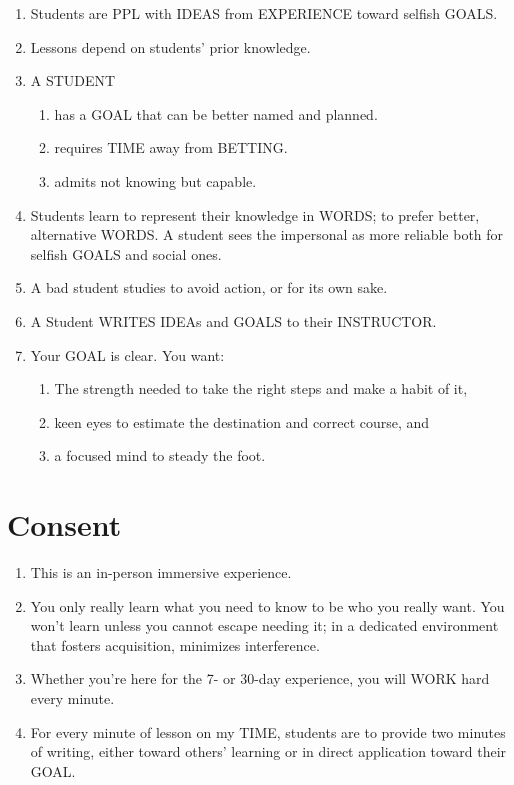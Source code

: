 \documentclass[
]{book}
\providecommand{\tightlist}{%
  \setlength{\itemsep}{0pt}\setlength{\parskip}{0pt}}
\begin{document}
\begin{enumerate}
\def\labelenumi{\arabic{enumi}.}
\setcounter{enumi}{26}
\tightlist
\item
  Students are PPL with IDEAS from EXPERIENCE toward selfish GOALS.
\item
  Lessons depend on students' prior knowledge.
\item
  A STUDENT

  \begin{enumerate}
  \def\labelenumii{\arabic{enumii}.}
  \tightlist
  \item
    has a GOAL that can be better named and planned.
  \item
    requires TIME away from BETTING.
  \item
    admits not knowing but capable.
  \end{enumerate}
\item
  Students learn to represent their knowledge in WORDS; to prefer
  better, alternative WORDS. A student sees the impersonal as more
  reliable both for selfish GOALS and social ones.
\item
  A bad student studies to avoid action, or for its own sake.
\item
  A Student WRITES IDEAs and GOALS to their INSTRUCTOR.
\item
  Your GOAL is clear. You want:

  \begin{enumerate}
  \def\labelenumii{\arabic{enumii}.}
  \tightlist
  \item
    The strength needed to take the right steps and make a habit of
    it,
  \item
    keen eyes to estimate the destination and correct course, and
  \item
    a focused mind to steady the foot.
  \end{enumerate}
\end{enumerate}

\hypertarget{consent}{%
\section{Consent}\label{consent}}

\begin{enumerate}
\def\labelenumi{\arabic{enumi}.}
\setcounter{enumi}{33}
\tightlist
\item
  This is an in-person immersive experience.
\item
  You only really learn what you need to know to be who you really
  want. You won't learn unless you cannot escape needing it; in a
  dedicated environment that fosters acquisition, minimizes
  interference.
\item
  Whether you're here for the 7- or 30-day experience, you will WORK
  hard every minute.
\item
  For every minute of lesson on my TIME, students are to provide two
  minutes of writing, either toward others' learning or in direct
  application toward their GOAL.
\end{enumerate}
\end{document}
